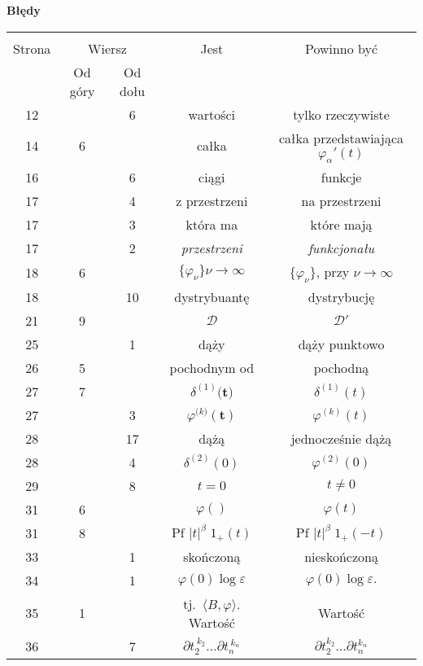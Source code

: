 \documentclass[a4paper,11pt]{article}
\newcommand{\ld}{\ldots}
\newcommand{\mr}{\mathrm}
\newcommand{\mc}{\mathcal}
\newcommand{\bsym}{\boldsymbol}
\newcommand{\ra}{\rightarrow}
\newcommand{\al}{\alpha}
\newcommand{\be}{\beta}
\newcommand{\del}{\delta}
\newcommand{\veps}{\varepsilon}
\newcommand{\vp}{\varphi}
\newcommand{\D}{\mc{D}}
\newcommand{\pr}{\partial}
\newcommand{\lket}{\langle}
\newcommand{\rket}{\rangle}
\newcommand{\tb}{\textbf}
\newcommand{\Center}[1]{\begin{center} #1 \end{center}}
\newcommand{\CenterTB}[1]{\Center{\tb{#1}}}
\newcommand{\Pf}{\mr{Pf}\,}
\begin{document}
\newpage
\CenterTB{Błędy}
\begin{center}
  \begin{tabular}{|c|c|c|c|c|}
    \hline
    & \multicolumn{2}{c|}{} & & \\
    Strona & \multicolumn{2}{c|}{Wiersz}& Jest & Powinno być \\ \cline{2-3}
    & Od góry & Od dołu &  &  \\ \hline
    12 & & 6 & wartości & tylko rzeczywiste \\
    14 & 6 & & całka & całka przedstawiająca $\vp_{ \al }'( t )$ \\
    16 & & 6 & ciągi & funkcje \\
    17 & & 4 & z przestrzeni & na przestrzeni \\
    17 & & 3 & która ma & które mają \\
    17 & & 2 & \emph{przestrzeni} & \emph{funkcjonału} \\
    18 & 6 & & $\{ \vp_{ \nu } \}\nu \ra \infty$ & $\{ \vp_{ \nu } \}$,
                                                   przy $\nu \ra \infty$ \\
    18 & & 10 & dystrybuantę & dystrybucję \\
    21 & 9 & & $\D$ & $\D'$ \\
    25 & & 1 & dąży & dąży punktowo \\
    26 & 5 & & pochodnym od & pochodną \\
    27 & 7 & & $\del^{ ( 1 ) }\bsym{ ( t } )$ & $\del^{ ( 1 ) }( t )$ \\
    27 & & 3 & $\vp^{ ( k \bsym{ ) } }\bsym{ ( t ) } $
           & $\vp^{ ( k ) }( t )$ \\
    28 & & 17 & dążą & jednocześnie dążą \\
    28 & & 4 & $\del^{ ( 2 ) }( 0 )$ & $\vp^{ ( 2 ) }( 0 )$ \\
    29 & & 8 & $t = 0$ & $t \neq 0$ \\
    31 & 6 & & $\vp( )$ & $\vp( t )$ \\
    31 & 8 & & $\Pf \, | t |^{ \be } \; 1_{ + }( t )$
           & $\Pf \, | t |^{ \be } \; 1_{ + }( -t )$ \\
    33 & & 1 & skończoną & nieskończoną \\
    34 & & 1 & $\vp( 0 ) \log\veps$ & $\vp( 0 ) \log\veps.$ \\
    35 & 1 & & tj.~$\lket B, \vp \rket$. Wartość & Wartość \\
    36 & & 7 & $\pr t_{ 2 }^{ \: k_{ 2 } } \ld \pr t_{ n }^{ \: k_{ n } }$
           & $\pr t_{ 2 }^{ k_{ 2 } } \ld \pr t_{ n }^{ k_{ n } }$ \\

\end{tabular}
\end{center}
\end{document}
